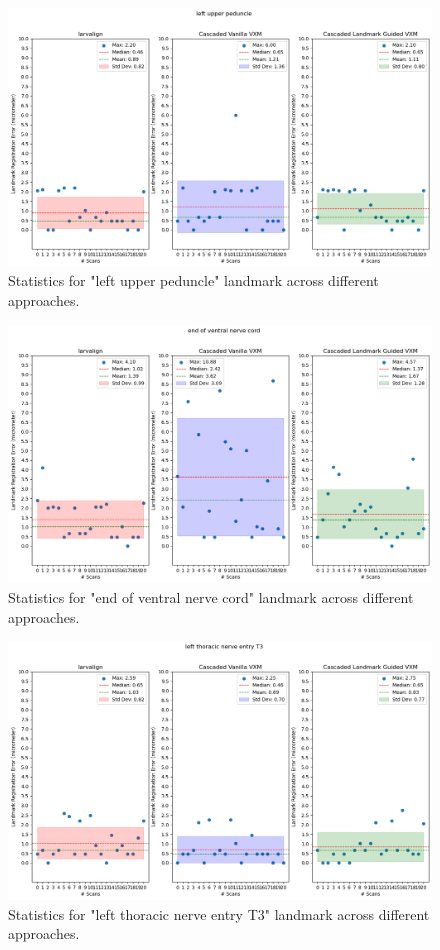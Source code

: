 \documentclass{report}
\begin{document}
\begin{figure}[h!]
	\centering
	\includegraphics[width=0.7\columnwidth]{resources/chapter5_fresh/output/left upper peduncle.png}
	\caption{Statistics for "left upper peduncle" landmark across different approaches.}
	\label{fig:landmark14}
\end{figure}

\begin{figure}[h!]
	\centering
	\includegraphics[width=0.7\columnwidth]{resources/chapter5_fresh/output/end of ventral nerve cord.png}
	\caption{Statistics for "end of ventral nerve cord" landmark across different approaches.}
	\label{fig:landmark15}
\end{figure}

\begin{figure}[h!]
	\centering
	\includegraphics[width=0.7\columnwidth]{resources/chapter5_fresh/output/left thoracic nerve entry T3.png}
	\caption{Statistics for "left thoracic nerve entry T3" landmark across different approaches.}
	\label{fig:landmark16}
\end{figure}
\end{document}
